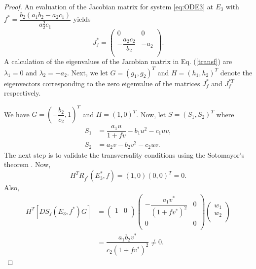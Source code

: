 \documentclass[10pt]{amsart}
\theoremstyle{definition}
\begin{document}
\begin{proof}
An evaluation of the Jacobian matrix for system \eqref{eq:ODE3} at $E_3$ with $f^*=\dfrac{b_2 \left(a_1 b_2-a_2 c_1\right)}{a_2^2 c_1}$ yields
\begin{equation}\label{transf}
J_f^*=
\left(
\begin{array}{cc}
     0& 0 \\
 -\dfrac{a_2c_2}{b_2} & -a_2 \\
\end{array}
\right).
\end{equation}
A calculation of the  eigenvalues of the Jacobian matrix in Eq. (\ref{transf}) are $\lambda_1=0$ and $\lambda_2=-a_2$. Next, we let $G=(g_1,g_2)^T$ and $H=(h_1,h_2)^T$ denote the eigenvectors corresponding  to the zero eigenvalue of the matrices $J_f^{*}$ and $J_f^{*T}$ respectively.

We have $G=\left(-\dfrac{b_2}{c_2},1 \right)^T$ and $H=\left(1,0 \right)^T$.  Now, let $S=(S_1,S_2)^T$ where 
	\begin{equation*}
		\begin{split}
			S_1&= \dfrac{a_1u}{1+fv}-b_1 u^2-c_1uv,\\
			S_2&= a_2 v-b_2v^2-c_2 uv.
		\end{split}
	\end{equation*}
	The next step is to validate the transversality conditions using the Sotomayor's theorem \cite{perko2013differential}. Now,
	$$H^TR_{f^*}(E_3^*,f)=\left(1,0 \right) \left(0,0 \right)^T= 0.$$
	Also,
	\begin{align*}
H^{T}\left[DS_{f}\left(E_3,f^* \right)G\right] &= \left(
\begin{array}{cc}
 1 & 0 \\
\end{array}
\right) 
\left(
\begin{array}{ccc}
 -\dfrac{a_1 v^*}{\left(1+fv^* \right)^2}& 0  \\
  0 & 0 \\
\end{array}
\right)
\left(
\begin{array}{ccc}
 w_1 \\
  w_2 \\
\end{array}
\right) \\
&=\dfrac{a_1b_2v^*}{c_2\left(1+fv^* \right)^2}\neq 0.
\end{align*}


\end{proof}
\end{document}
